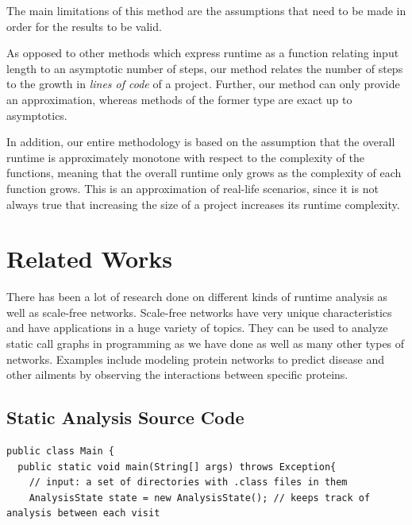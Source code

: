 \documentclass[11pt,a4paper,twocolumn]{article}
\begin{document}
\begin{singlespace}
The main limitations of this method are the assumptions that need to be made in
order for the results to be valid.

As opposed to other methods which express runtime as a function relating input
length to an asymptotic number of steps, our method relates the number of steps
to the growth in \emph{lines of code} of a project. Further, our method can
only provide an approximation, whereas methods of the former type are exact
up to asymptotics.

In addition, our entire methodology is based on the assumption that the overall
runtime is approximately monotone with respect to the complexity of the
functions, meaning that the overall runtime only grows as the complexity of
each function grows. This is an approximation of real-life scenarios, since
it is not always true that increasing the size of a project increases its
runtime complexity.

\section{Related Works}

There has been a lot of research done on different kinds of runtime analysis as
well as scale-free networks. Scale-free networks have very unique characteristics
and have applications in a huge variety of topics. They can be used to analyze
static call graphs in programming as we have done as well as many other types
of networks. Examples include modeling protein networks to predict disease and
other ailments by observing the interactions between specific proteins.


\printbibliography[title={References}]

\onecolumn
\begin{appendices}
\section{Static Analysis Source Code}
\begin{lstlisting}[caption={Main.java}]
public class Main {
  public static void main(String[] args) throws Exception{
    // input: a set of directories with .class files in them
    AnalysisState state = new AnalysisState(); // keeps track of analysis between each visit


\end{lstlisting}
\end{appendices}
\end{singlespace}
\end{document}
